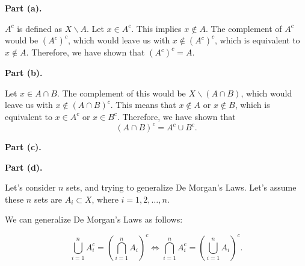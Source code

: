\documentclass[11pt]{article}
\begin{document}
\begin{solution}

\textbf{Part (a).}

$A^c$ is defined as $X\backslash A$. Let $x\in A^c$. This implies $x\notin A$. The complement of $A^c$ would be $(A^c)^c$, which would leave us with $x\notin (A^c)^c$, which is equivalent to $x\notin A$. Therefore, we have shown that $(A^c)^c=A$.

\bigskip

\textbf{Part (b).}

Let $x\in A\cap B$. The complement of this would be $X\backslash(A\cap B)$, which would leave us with $x\notin(A\cap B)^c$. This means that $x\notin A$ or $x\notin B$, which is equivalent to $x\in A^c$ or $x\in B^c$. Therefore, we have shown that
\[
(A\cap B)^c=A^c\cup B^c.
\]

\bigskip

\textbf{Part (c).}

\begin{center}
\end{center}

\bigskip

\textbf{Part (d).}

Let's consider $n$ sets, and trying to generalize De Morgan's Laws. Let's assume these $n$ sets are $A_i\subset X$, where $i=1,2,\ldots,n$.

We can generalize De Morgan's Laws as follows:

\[
\bigcup_{i=1}^n A_i^c
=
\left(\bigcap_{i=1}^n A_i\right)^c
\Longleftrightarrow
\bigcap_{i=1}^n A_i^c
=
\left(\bigcup_{i=1}^n A_i\right)^c.
\]

\end{solution}
\end{document}
